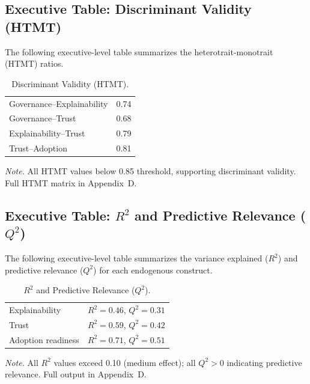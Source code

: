 \subsection{Executive Table: Discriminant Validity (HTMT)}
\label{sec:exec_discriminant_validity}

\noindent The following executive-level table summarizes the heterotrait-monotrait (HTMT) ratios.

{\tablestripes\tablefontsize
{}
\begin{xltabular}{\textwidth}{@{} >{\raggedright\arraybackslash}p{6cm} L @{}}
\caption[Discriminant Validity (HTMT)]{Discriminant Validity (HTMT).}\label{tab:exec_discriminant_validity} \\
\toprule
{} &  \\
\midrule
\endfirsthead
\endhead
\bottomrule
\endlastfoot
Governance--Explainability & 0.74 \\
\addlinespace
Governance--Trust & 0.68 \\
\addlinespace
Explainability--Trust & 0.79 \\
\addlinespace
Trust--Adoption & 0.81 \\
\end{xltabular}}
\vspace{0.3em}\noindent\textit{Note.} All HTMT values below 0.85 threshold, supporting discriminant validity. Full HTMT matrix in Appendix~D.


\subsection{Executive Table: $R^2$ and Predictive Relevance ($Q^2$)}
\label{sec:exec_r2_q2}

\noindent The following executive-level table summarizes the variance explained ($R^2$) and predictive relevance ($Q^2$) for each endogenous construct.

{\tablestripes\tablefontsize
{}
\begin{xltabular}{\textwidth}{@{} >{\raggedright\arraybackslash}p{6cm} L @{}}
\caption[$R^2$ and Predictive Relevance ($Q^2$)]{$R^2$ and Predictive Relevance ($Q^2$).}\label{tab:exec_r2_q2} \\
\toprule
{} &  \\
\midrule
\endfirsthead
\endhead
\bottomrule
\endlastfoot
Explainability & $R^2 = 0.46$, $Q^2 = 0.31$ \\
\addlinespace
Trust & $R^2 = 0.59$, $Q^2 = 0.42$ \\
\addlinespace
Adoption readiness & $R^2 = 0.71$, $Q^2 = 0.51$ \\
\end{xltabular}}
\vspace{0.3em}\noindent\textit{Note.} All $R^2$ values exceed 0.10 (medium effect); all $Q^2 > 0$ indicating predictive relevance. Full output in Appendix~D.


